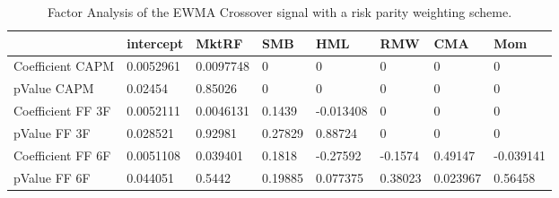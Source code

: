 \begin{table}[H]
\centering
\begin{tabular}{llllllll}
\hline& intercept & MktRF & SMB & HML & RMW & CMA & Mom \\ 
\hline 
Coefficient CAPM & 0.0052961 & 0.0097748 & 0 & 0 & 0 & 0 & 0 \\ 
pValue CAPM & 0.02454 & 0.85026 & 0 & 0 & 0 & 0 & 0 \\ 
Coefficient FF 3F & 0.0052111 & 0.0046131 & 0.1439 & -0.013408 & 0 & 0 & 0 \\ 
pValue FF 3F & 0.028521 & 0.92981 & 0.27829 & 0.88724 & 0 & 0 & 0 \\ 
Coefficient FF 6F & 0.0051108 & 0.039401 & 0.1818 & -0.27592 & -0.1574 & 0.49147 & -0.039141 \\ 
pValue FF 6F & 0.044051 & 0.5442 & 0.19885 & 0.077375 & 0.38023 & 0.023967 & 0.56458 \\ 
\hline
\end{tabular}
\caption{Factor Analysis of the EWMA Crossover signal with a risk parity weighting scheme.}
\label{MBBSRPOQ_FACTOR}
\end{table}